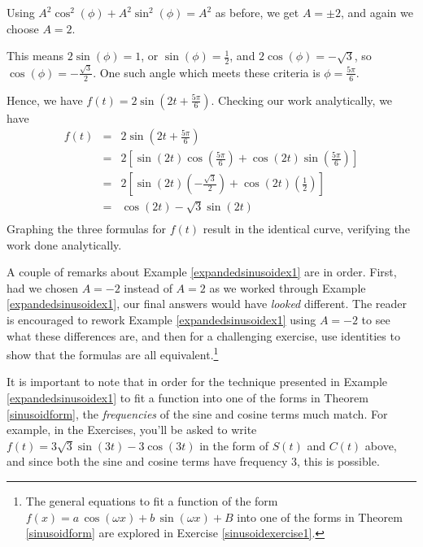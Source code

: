 \documentclass{ximera}
\begin{document}
\begin{example}
\begin{enumerate}
 

Using $A^2\cos^{2}(\phi) + A^2\sin^{2}(\phi) = A^2$ as before, we get $A = \pm 2$, and again we choose $A = 2$.  

 

This means $2 \sin(\phi) = 1$, or $\sin(\phi) = \frac{1}{2}$,  and $2\cos(\phi) = -\sqrt{3}$, so $\cos(\phi) = -\frac{\sqrt{3}}{2}$.  One such angle which meets these criteria  is $\phi = \frac{5\pi}{6}$.  

 

Hence, we have $f(t) = 2 \sin\left(2t + \frac{5\pi}{6}\right)$.  Checking our work analytically, we have \[\begin{array}{rcl} f(t) &  = &  2 \sin\left(2t + \frac{5\pi}{6}\right) \\   & = &  2 \left[ \sin(2t) \cos\left(\frac{5\pi}{6}\right) + \cos(2t) \sin\left(\frac{5\pi}{6}\right) \right]\\   & = & 2 \left[ \sin(2t) \left(-\frac{\sqrt{3}}{2}\right) +  \cos(2t) \left(\frac{1}{2}\right)\right] \\   & = & \cos(2t) - \sqrt{3} \sin(2t) \\ \end{array}\] Graphing the three formulas for $f(t)$ result in the identical curve, verifying the work done analytically.

\begin{center}
\end{center}


\end{enumerate}

\end{example}

A couple of remarks about Example \ref{expandedsinusoidex1} are in order.   First, had we chosen  $A = -2$ instead of $A = 2$ as we worked through Example \ref{expandedsinusoidex1}, our final answers would have \textit{looked} different. The reader is encouraged to rework Example  \ref{expandedsinusoidex1} using $A = -2$ to see what these differences are, and then for a challenging exercise, use identities to show that the formulas are all equivalent.\footnote{The general equations to fit a function of the form $f(x) = a \, \cos(\omega x) + b \, \sin(\omega x) + B$ into one of the forms in Theorem \ref{sinusoidform} are explored in Exercise \ref{sinusoidexercise1}.}

 

It is important to note that in order for the technique presented in Example \ref{expandedsinusoidex1} to fit a function into one of the forms in Theorem \ref{sinusoidform},  the \textit{frequencies} of the sine and cosine terms much match.  For example,  in the Exercises, you'll be asked to write $f(t) = 3\sqrt{3}\sin(3t) - 3\cos(3t)$ in the form of $S(t)$ and $C(t)$ above, and since both the sine and cosine terms have frequency $3$, this is possible.
\end{document}
